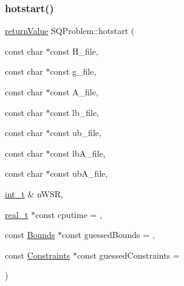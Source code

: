 \subsubsection{\texorpdfstring{hotstart()}{hotstart()}\hspace{0.1cm}{\footnotesize\ttfamily [3/5]}}
{\footnotesize\ttfamily \hyperlink{_message_handling_8hpp_a81d556f613bfbabd0b1f9488c0fa865e}{return\+Value} S\+Q\+Problem\+::hotstart (\begin{DoxyParamCaption}\item[{const char $\ast$const}]{H\+\_\+file,  }\item[{const char $\ast$const}]{g\+\_\+file,  }\item[{const char $\ast$const}]{A\+\_\+file,  }\item[{const char $\ast$const}]{lb\+\_\+file,  }\item[{const char $\ast$const}]{ub\+\_\+file,  }\item[{const char $\ast$const}]{lb\+A\+\_\+file,  }\item[{const char $\ast$const}]{ub\+A\+\_\+file,  }\item[{\hyperlink{_types_8hpp_ab6fd6105e64ed14a0c9281326f05e623}{int\+\_\+t} \&}]{n\+W\+SR,  }\item[{\hyperlink{qp_o_a_s_e_s__wrapper_8h_a0d00e2b3dfadee81331bbb39068570c4}{real\+\_\+t} $\ast$const}]{cputime = {},  }\item[{const \hyperlink{class_bounds}{Bounds} $\ast$const}]{guessed\+Bounds = {},  }\item[{const \hyperlink{class_constraints}{Constraints} $\ast$const}]{guessed\+Constraints = {} }\end{DoxyParamCaption})}

